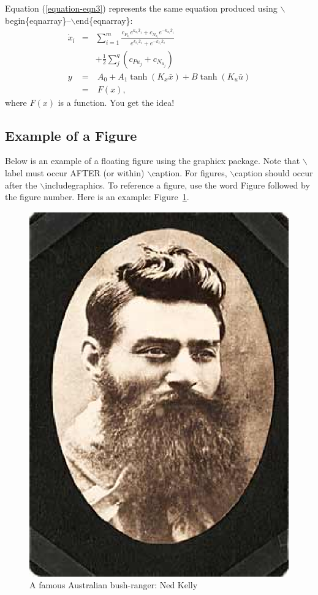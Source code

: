 \documentclass[conference]{IEEEtran}
\begin{document}
Equation (\ref{equation-eqn3}) represents the same equation produced
using $\backslash$begin\{eqnarray\}--$\backslash$end\{eqnarray\}:
\begin{eqnarray}
\dot {x}_l&=& \sum_{i = 1}^m {\frac{c_{P_{x_i} } e^{k_{x_i}\bar{x}_i} + c_{N_{x_i} }
e^{ - k_{x_i} \bar{x}_i}}{e^{k_{x_i} \bar{x}_i} + e^{ - k_{x_i} \bar{x}_i}}} \nonumber\\
&&+ \frac{1}{2}\sum\limits_j^q (c_{P{u_j }} + c_{N _{u_j }} ) \nonumber\\
y&=& \ A_0 + A_1 \tanh (K_x \bar {x}) + B\tanh (K_u \bar {u})\nonumber\\
&=& \ F(x),
\label{equation-eqn3}
\end{eqnarray}
where $F(x)$ is a function.  You get the idea!

\subsection{Example of a Figure}
Below is an example of a floating figure using the graphicx
package.  Note that $\backslash$label must occur AFTER (or within)
$\backslash$caption.  For figures, $\backslash$caption should occur
after the $\backslash$includegraphics.  To reference a figure, use
the word Figure followed by the figure number.  Here is an example:
Figure~\ref{figure-fig1}.

\begin{figure}[htp]
\centerline{\includegraphics[width=0.6\columnwidth]{NedKelly.eps}}
\caption{A famous Australian bush-ranger: Ned Kelly}
\label{figure-fig1}
\end{figure}
\end{document}
